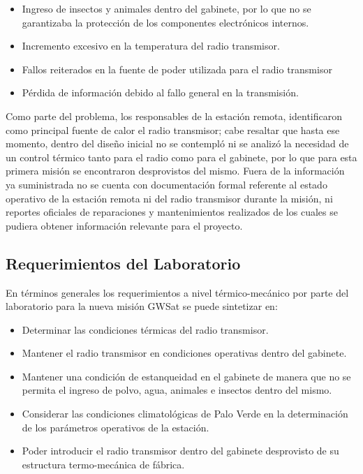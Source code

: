 \begin{itemize}
    \item Ingreso de insectos y animales dentro del gabinete, por lo que no se garantizaba la protección de los componentes electrónicos internos.
    \item Incremento excesivo en la temperatura del radio transmisor.
    \item Fallos reiterados en la fuente de poder utilizada para el radio transmisor
    \item Pérdida de información debido al fallo general en la transmisión.
\end{itemize}

Como parte del problema, los responsables de la estación remota, identificaron como principal fuente de calor el radio transmisor; cabe resaltar que hasta ese momento, dentro del diseño inicial no se contempló ni se analizó la necesidad de un control térmico tanto para el radio como para el gabinete, por lo que para esta primera misión se encontraron desprovistos del mismo. Fuera de la información ya suministrada no se cuenta con documentación formal referente al estado operativo de la estación remota ni del radio transmisor durante la misión, ni reportes oficiales de reparaciones y mantenimientos realizados de los cuales se pudiera obtener información relevante para el proyecto.

\subsection{Requerimientos del Laboratorio}
En términos generales los requerimientos a nivel térmico-mecánico  por parte del laboratorio para la nueva misión GWSat se puede sintetizar en:
\begin{itemize}
    \item Determinar las condiciones térmicas del radio transmisor.
    \item Mantener el radio transmisor en condiciones operativas dentro del gabinete.
    \item Mantener una condición de estanqueidad en el gabinete de manera que no se permita el ingreso de polvo, agua, animales e insectos dentro del mismo.
    \item Considerar las condiciones climatológicas de Palo Verde en la determinación de los parámetros operativos de la estación.
    \item Poder introducir el radio transmisor dentro del gabinete desprovisto de su estructura termo-mecánica de fábrica.  
\end{itemize}

